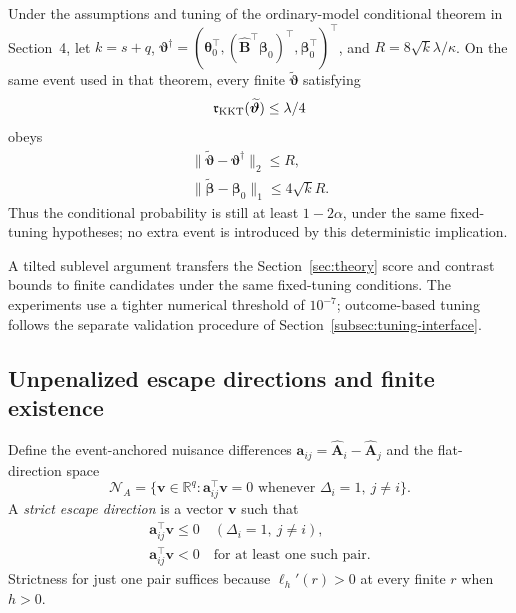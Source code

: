 \begin{corollary}
\label{cor:comp-statistical-tolerance}
Under the assumptions and tuning of the ordinary-model conditional theorem in Section~4, let $k=s+q$, $\bm{\vartheta}^\dagger=(\bm{\theta}_0^\top,(\widehat{\bm{B}}^\top\bm{\beta}_0)^\top,\bm{\beta}_0^\top)^\top$, and $R=8\sqrt{k}\lambda/\kappa$. On the same event used in that theorem, every finite $\widetilde{\bm{\vartheta}}$ satisfying
\begin{equation}
 \mathfrak r_{\rm KKT}(\widetilde{\bm{\vartheta}})\le\lambda/4
 \label{eq:comp-statistical-tolerance}
\end{equation}
obeys
\begin{equation}
 \begin{gathered}
\|\widetilde{\bm{\vartheta}}-\bm{\vartheta}^\dagger\|_2\le R,\\
 \|\widetilde{\bm{\beta}}-\bm{\beta}_0\|_1\le4\sqrt{k}R.
 \end{gathered}
 \label{eq:comp-statistical-transfer}
\end{equation}
Thus the conditional probability is still at least $1-2\alpha$, under the same fixed-tuning hypotheses; no extra event is introduced by this deterministic implication.
\end{corollary}
A tilted sublevel argument transfers the Section~\ref{sec:theory} score and contrast bounds to finite candidates under the same fixed-tuning conditions. The experiments use a tighter numerical threshold of $10^{-7}$; outcome-based tuning follows the separate validation procedure of Section~\ref{subsec:tuning-interface}.

\subsection{Unpenalized escape directions and finite existence}
\label{subsec:comp-existence}
Define the event-anchored nuisance differences $\bm{a}_{ij}=\widehat{\bm{A}}_i-\widehat{\bm{A}}_j$ and the flat-direction space
\[
 \mathcal N_A=\{\bm{v}\in\mathbb R^q:\bm{a}_{ij}^\top \bm{v}=0
                         \text{ whenever }\Delta_i=1,\ j\ne i\}.
\]
A \emph{strict escape direction} is a vector $\bm{v}$ such that
\begin{equation}
 \begin{gathered}
\bm{a}_{ij}^\top \bm{v}\le0\quad(\Delta_i=1,\ j\ne i),
 \\
 \bm{a}_{ij}^\top \bm{v}<0\quad\text{for at least one such pair}.
 \end{gathered}
 \label{eq:comp-escape}
\end{equation}
Strictness for just one pair suffices because $\ell_h'(r)>0$ at every finite $r$ when $h>0$.

